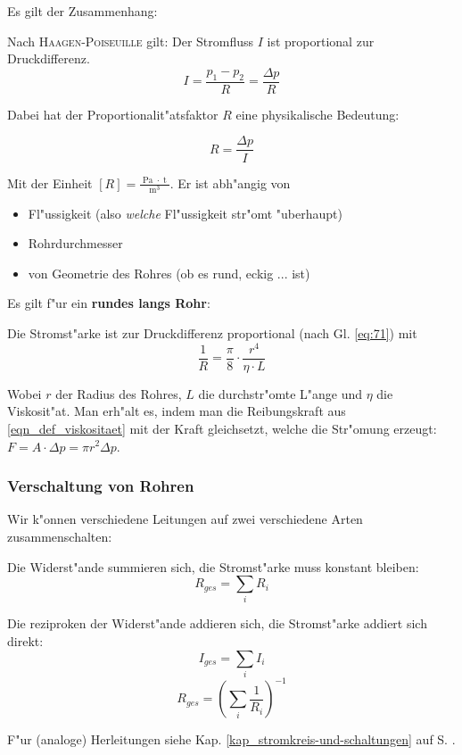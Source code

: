 Es gilt der Zusammenhang:
\begin{Wichtig}
Nach \textsc{Haagen-Poiseuille} gilt: Der Stromfluss $I$ ist
proportional zur Druckdifferenz.
\begin{equation}
   \label{eqn_stromstaerke-bei-druckdifferenz}
   I = \frac{p_1 - p_2}{R} = \frac{\Delta p}{R}
\end{equation}
\end{Wichtig}
Dabei hat der Proportionalit"atsfaktor $R$ eine physikalische Bedeutung:
\begin{Def}
   \begin{equation}
      \label{eq:71}
\boxed{ R = \frac{\Delta p}{I}}
   \end{equation}
\end{Def}
Mit der Einheit $[R] = \frac{\operatorname{Pa} \cdot \operatorname{t}}{\operatorname{m}^3}$.
Er ist abh"angig von 
\begin{itemize}
\item Fl"ussigkeit (also \emph{welche} Fl"ussigkeit str"omt "uberhaupt)
\item Rohrdurchmesser
\item von Geometrie des Rohres (ob es rund, eckig ... ist)
\end{itemize}
Es gilt f"ur ein \textbf{rundes langs Rohr}:
\begin{Wichtig}
   Die Stromst"arke ist zur Druckdifferenz proportional (nach
   Gl. \eqref{eq:71}) mit
\begin{equation}
   \label{eq:70}
   \frac{1}{R} = \frac{\pi}{8} \cdot \frac{r^4}{\eta \cdot L}
\end{equation}   
\end{Wichtig}
Wobei $r$ der Radius des Rohres, $L$ die durchstr"omte L"ange und
$\eta$ die Viskosit"at. Man erh"alt es, indem man die Reibungskraft aus
\eqref{eqn_def_viskositaet} mit der Kraft gleichsetzt, welche die
Str"omung erzeugt: $F = A \cdot \Delta p = \pi r^2 \Delta p$.


\subsubsection{Verschaltung von Rohren}
\label{kap_verschaltung-von-rohren}


Wir k"onnen verschiedene Leitungen auf zwei verschiedene Arten
zusammenschalten:
\begin{description}[\setlabelstyle{\bfseries\slshape}]
\item[\index{Reihenschaltung}Reihenschaltung] Die Widerst"ande
   summieren sich, die Stromst"arke muss konstant bleiben:
$$
R_{ges} = \sum_i R_i
$$

\item[\index{Parallelschaltung}Parallelschaltung]
Die reziproken der Widerst"ande addieren sich, die Stromst"arke addiert
sich direkt:
$$I_{ges} = \sum_i I_i$$
$$R_{ges} = \left ( \sum_i \frac{1}{R_i} \right )^{-1}$$
\end{description}
F"ur (analoge) Herleitungen siehe
Kap. \ref{kap_stromkreis-und-schaltungen} auf
S. \pageref{kap_stromkreis-und-schaltungen}.

